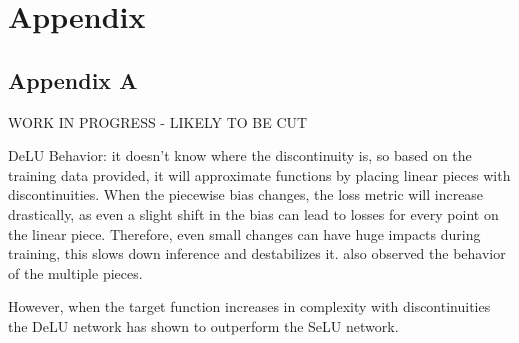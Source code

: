 \chapter{Appendix} \label{chapter:Appendix}

\section{Appendix A}

WORK IN PROGRESS - LIKELY TO BE CUT

DeLU Behavior:
it doesn't know where the discontinuity is, so based on the training data provided, it will approximate functions by placing linear pieces  with discontinuities. When the piecewise bias changes, the loss metric will increase drastically, as even a slight shift in the bias can lead to losses for every point on the linear piece. Therefore, even small changes can have huge impacts during training, this slows down inference and destabilizes it. \cite{wang2023deep} also observed the behavior of the multiple pieces.

However, when the target function increases in complexity with discontinuities the DeLU network has shown to outperform the SeLU network.